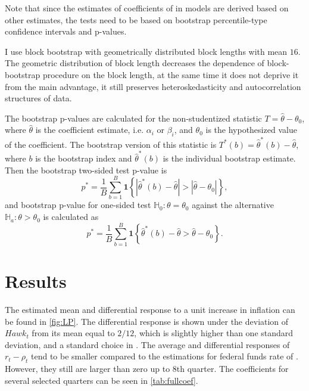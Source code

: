 \documentclass[12pt]{article}
\numberwithin{equation}{section}
\begin{document}
Note that since the estimates of coefficients of in models  are derived based on other estimates, the tests need to be based on bootstrap percentile-type confidence intervals and p-values.

I use block bootstrap with geometrically distributed block lengths with mean $16$. The geometric distribution of block length decreases the dependence of block-bootstrap procedure on the block length, at the same time it does not deprive it from the main advantage, it still preserves heteroskedasticity and autocorrelation structures of data.

The bootstrap p-values are calculated for the non-studentized statistic $T=\hat\theta-\theta_0$, where $\hat\theta$ is the coefficient estimate, i.e. $\alpha_i$ or $\beta_i$, and $\theta_0$ is the hypothesized value of the coefficient. 
The bootstrap version of this statistic is $T^*(b)=\hat\theta^*(b)-\hat\theta$, where $b$ is the bootstrap index and $\hat\theta^*(b)$ is the individual bootstrap estimate. Then the bootstrap two-sided test p-value is
\[p^*=\frac{1}{B}\sum_{b=1}^B\mathbf{1}\left\{\left|\hat\theta^*(b)-\hat\theta\right|>\left|\hat\theta-\theta_0\right|\right\},\]
and bootstrap p-value for one-sided test $\mathbb{H}_0:\theta=\theta_0$ against the alternative $\mathbb{H}_a:\theta>\theta_0$ is calculated as
\[p^*=\frac{1}{B}\sum_{b=1}^B\mathbf{1}\left\{\hat\theta^*(b)-\hat\theta >\hat\theta-\theta_0\right\}.\]




\section{Results}
The estimated mean and differential response to a unit increase in inflation can be found in \vref{fig:LP}. The differential response is shown under the deviation of $\mathit{Hawk}_t$ from its mean equal to $2/12$, which is slightly higher than one standard deviation, and a standard choice in \citet{HIM2023}. The average and differential responses of  $r_t-\rho_t$ tend to be smaller compared to the estimations for federal funds rate of \citet{HIM2023}. However, they still are larger than zero up to 8th quarter. The coefficients for several selected quarters can be seen in \vref{tab:fullcoef}. 
\end{document}

